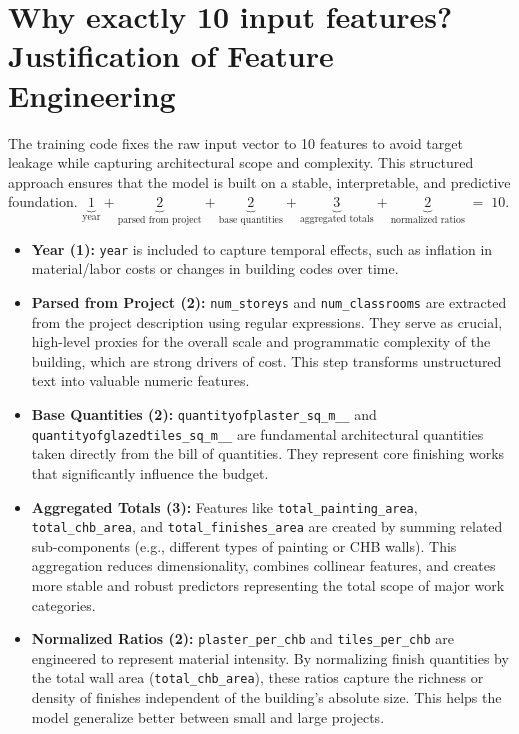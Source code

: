 \documentclass[11pt]{article}
\newcommand{\code}[1]{\texttt{#1}}
\begin{document}
\section*{Why exactly 10 input features? Justification of Feature Engineering}
The training code fixes the raw input vector to 10 features to avoid target leakage while capturing architectural scope and complexity. This structured approach ensures that the model is built on a stable, interpretable, and predictive foundation.
\(
\underbrace{1}_{\text{year}} + \underbrace{2}_{\text{parsed from project}} + \underbrace{2}_{\text{base quantities}} + \underbrace{3}_{\text{aggregated totals}} + \underbrace{2}_{\text{normalized ratios}} 
\;=\; 10.
\)
\begin{itemize}
    \item \textbf{Year (1):} \code{year} is included to capture temporal effects, such as inflation in material/labor costs or changes in building codes over time.
    \item \textbf{Parsed from Project (2):} \code{num\_storeys} and \code{num\_classrooms} are extracted from the project description using regular expressions. They serve as crucial, high-level proxies for the overall scale and programmatic complexity of the building, which are strong drivers of cost. This step transforms unstructured text into valuable numeric features.
    \item \textbf{Base Quantities (2):} \code{quantityofplaster\_sq\_m\_\_} and \code{quantityofglazedtiles\_sq\_m\_\_} are fundamental architectural quantities taken directly from the bill of quantities. They represent core finishing works that significantly influence the budget.
    \item \textbf{Aggregated Totals (3):} Features like \code{total\_painting\_area}, \code{total\_chb\_area}, and \code{total\_finishes\_area} are created by summing related sub-components (e.g., different types of painting or CHB walls). This aggregation reduces dimensionality, combines collinear features, and creates more stable and robust predictors representing the total scope of major work categories.
    \item \textbf{Normalized Ratios (2):} \code{plaster\_per\_chb} and \code{tiles\_per\_chb} are engineered to represent material intensity. By normalizing finish quantities by the total wall area (\code{total\_chb\_area}), these ratios capture the richness or density of finishes independent of the building's absolute size. This helps the model generalize better between small and large projects.
\end{itemize}
\end{document}
